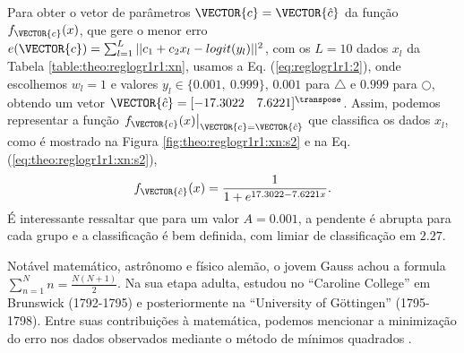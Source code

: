 \begin{SolutionT}\label{sol:theo:reglogr1r1:s2}
Para obter o vetor de parâmetros $\VECTOR{c}=\VECTOR{\hat{c}}$ da função $f_{\VECTOR{c}}(x)$, 
que gere o menor erro $e(\VECTOR{c}) =  \sum_{l=1}^{L} ||c_1 +c_2 x_l-logit(y_l)||^2$,
com os $L=10$ dados $x_l$ da Tabela \ref{table:theo:reglogr1r1:xn},
usamos a Eq. (\ref{eq:reglogr1r1:2}), onde escolhemos $w_l=1$ e valores $y_l \in \{0.001,~ 0.999\}$,
$0.001$ para $\bigtriangleup$ e $0.999$ para $\bigcirc$,
obtendo um vetor $\VECTOR{\hat{c}}=[-17.3022\quad 7.6221]^{\transpose}$. 
Assim, podemos representar a função $\left.f_{\VECTOR{c}}(x)\right|_{\VECTOR{c}=\VECTOR{\hat{c}}}$ 
que classifica os dados $x_l$, 
como é mostrado na Figura \ref{fig:theo:reglogr1r1:xn:s2}  e na Eq. (\ref{eq:theo:reglogr1r1:xn:s2}),
\begin{equation}\label{eq:theo:reglogr1r1:xn:s2}
f_{\VECTOR{\hat{c}}}(x)= \frac{1}{1+e^{ 17.3022-7.6221 x}}.
\end{equation}
É interessante ressaltar que para um valor $A=0.001$, 
a pendente é abrupta para cada grupo e a classificação é bem definida,
com limiar de classificação em $2.27$.
\end{SolutionT}

\begin{elaboracion}[title=Karl Friedrich Gauss (1777-1855), width= 0.99\linewidth]
\label{elab:Gauss}
\noindent
Notável matemático, astrônomo e físico alemão,
o jovem Gauss achou a formula $\sum_{n=1}^{N}n=\frac{N(N+1)}{2}$.
Na sua etapa adulta, estudou no ``Caroline College'' em Brunswick (1792-1795)
e posteriormente na ``University of G\"ottingen'' (1795-1798).
Entre suas contribuições à matemática, podemos mencionar 
a minimização do erro nos dados observados
 mediante o método de mínimos quadrados \cite[pp. 225]{agarwal2014creators}.
\end{elaboracion}
